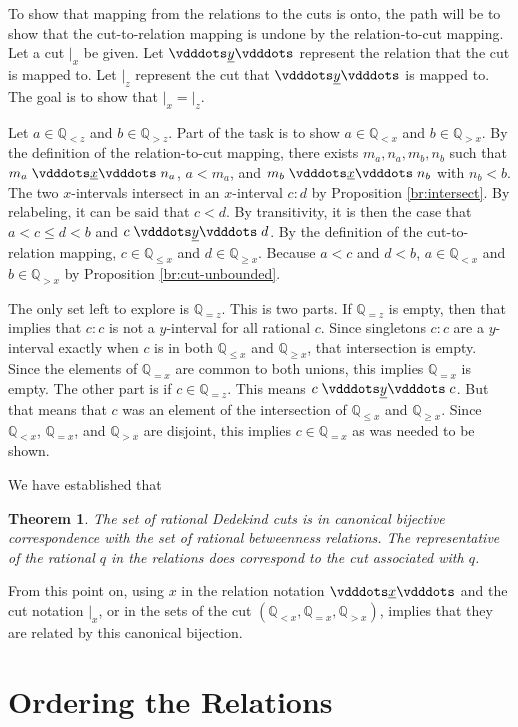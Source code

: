 \documentclass{rmj-public}
\newtheorem{theorem}{Theorem}[section]
\newcommand{\qcut}[2][x]{\ensuremath{\mathbb{Q}_{#2 #1}}}
\newcommand{\qlt}[1][x]{\qcut[#1]{<}}
\newcommand{\qeq}[1][x]{\qcut[#1]{=}}
\newcommand{\qgt}[1][x]{\qcut[#1]{>}}
\newcommand{\qgeq}[1][x]{\qcut[#1]{\geq}}
\newcommand{\qleq}[1][x]{\qcut[#1]{\leq}}
\newcommand{\cut}[1][x]{{\vert}_{#1} }
\newcommand{\yrel}{\xrel[y]}
\begin{document}
To show that mapping from the relations to the cuts is onto, the path will be to show that the cut-to-relation mapping is undone by the relation-to-cut mapping. Let a cut $\cut$ be given. Let $\yrel$ represent the relation that the cut is mapped to. Let $\cut[z]$ represent the cut that $\yrel$ is mapped to. The goal is to show that $\cut = \cut[z]$.  

Let $a \in \qlt[z]$ and $b \in \qgt[z]$. Part of the task is to show $a \in \qlt$ and $b \in \qgt$. By the definition of the relation-to-cut mapping, there exists $m_a, n_a, m_b, n_b$ such that $m_a \xrel n_a$, $a < m_a$, and $m_b \xrel n_b$ with $n_b < b$. The two $x$-intervals intersect in an $x$-interval $c:d$ by  Proposition \ref{br:intersect}. By relabeling, it can be said that $c < d$. By transitivity, it is then the case that $a < c \leq d < b$ and $c \yrel d$. By the definition of the cut-to-relation mapping, $c \in \qleq$ and $d \in \qgeq$. Because $a < c$ and $ d < b$, $a \in \qlt$ and $b \in \qgt$ by Proposition \ref{br:cut-unbounded}.

The only set left to explore is $\qeq[z]$. This is two parts. If $\qeq[z]$ is empty, then that implies that $c:c$ is not a $y$-interval for all rational $c$. Since singletons $c:c$ are a $y$-interval exactly when $c$ is in both $\qleq$ and $\qgeq$, that intersection is empty. Since the elements of $\qeq$ are common to both unions, this implies $\qeq$ is empty. The other part is if $c \in \qeq[z]$. This means $c \yrel c$. But that means that $c$ was an element of the intersection of $\qleq$ and $\qgeq$. Since $\qlt$, $\qeq$, and $\qgt$ are disjoint, this implies $c \in \qeq$ as was needed to be shown. 


We have established that
\begin{theorem}
    The set of rational Dedekind cuts is in canonical bijective correspondence with the set of rational betweenness relations. The representative of the rational $q$ in the relations does correspond to the cut associated with $q$.
\end{theorem}

From this point on, using $x$ in the relation notation $\xrel$ and the cut notation $\cut$, or in the sets of the cut $(\qlt, \qeq, \qgt)$, implies that they are related by this canonical bijection. 

\section{Ordering the Relations}
\end{document}
